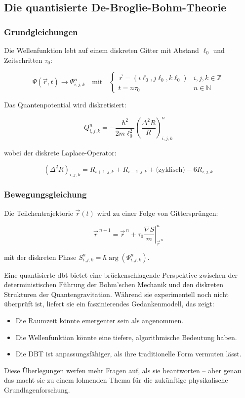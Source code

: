 \subsection{Die quantisierte De-Broglie-Bohm-Theorie}
\label{sec:discrete-dbb}

\subsubsection{Grundgleichungen}
Die Wellenfunktion lebt auf einem diskreten Gitter mit Abstand $\ell_0$ und Zeitschritten $\tau_0$:

\begin{equation}
\Psi(\vec{r}, t) \rightarrow \Psi_{i,j,k}^n \quad \text{mit} \quad 
\begin{cases}
\vec{r} = (i\ell_0, j\ell_0, k\ell_0) & i,j,k \in \mathbb{Z} \\
t = n \tau_0 & n \in \mathbb{N}
\end{cases}
\end{equation}

Das Quantenpotential wird diskretisiert:

\begin{equation}
Q_{i,j,k}^n = -\frac{\hbar^2}{2m\ell_0^2} \left( \frac{\Delta^2 R}{R} \right)_{i,j,k}^n
\end{equation}

wobei der diskrete Laplace-Operator:

\begin{equation}
(\Delta^2 R)_{i,j,k} = R_{i+1,j,k} + R_{i-1,j,k} + \text{(zyklisch)} - 6R_{i,j,k}
\end{equation}

\subsubsection{Bewegungsgleichung}
Die Teilchentrajektorie $\vec{r}(t)$ wird zu einer Folge von Gittersprüngen:

\begin{equation}
\vec{r}^{~n+1} = \vec{r}^{~n} + \tau_0 \left. \frac{\nabla S}{m} \right|_{\vec{r}^{~n}}^n
\end{equation}

mit der diskreten Phase $S_{i,j,k}^n = \hbar \arg(\Psi_{i,j,k}^n)$.

Eine quantisierte \gls{dbt} bietet eine brückenschlagende Perspektive zwischen der deterministischen Führung der Bohm'schen Mechanik und den diskreten Strukturen der
Quantengravitation. Während sie experimentell noch nicht überprüft ist, liefert sie ein faszinierendes Gedankenmodell, das zeigt:
\begin{itemize}
    \item Die Raumzeit könnte emergenter sein als angenommen.
    \item Die Wellenfunktion könnte eine tiefere, algorithmische Bedeutung haben.
    \item Die DBT ist anpassungsfähiger, als ihre traditionelle Form vermuten lässt.
\end{itemize}
Diese Überlegungen werfen mehr Fragen auf, als sie beantworten – aber genau das macht sie zu einem lohnenden Thema für die zukünftige physikalische Grundlagenforschung.

